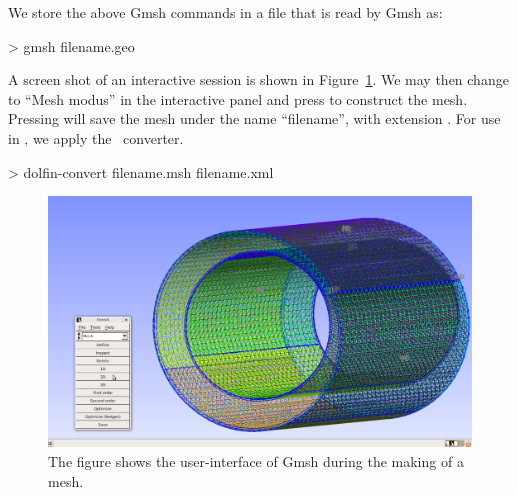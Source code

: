 We store the above Gmsh commands in a  file that is read by Gmsh as:
\begin{bash}
> gmsh filename.geo
\end{bash}
A screen shot of an interactive session is shown in
Figure~\ref{fig:Gmsh_mesh}. We may then change to ``Mesh modus'' in the
interactive panel and press  to construct the
mesh. Pressing  will save the mesh under the name
``filename'', with extension . For use in \dolfin, we apply
the \dolfin\ converter.

\begin{bash}
> dolfin-convert filename.msh filename.xml
\end{bash}

\begin{figure}
\bwfig
  \centering
  \includegraphics[width=\largefig]{chapters/hentschel/pdf/gmsh.pdf}
  \caption{The figure shows the user-interface of Gmsh during the making
    of a mesh.}
  \label{fig:Gmsh_mesh}
\end{figure}

